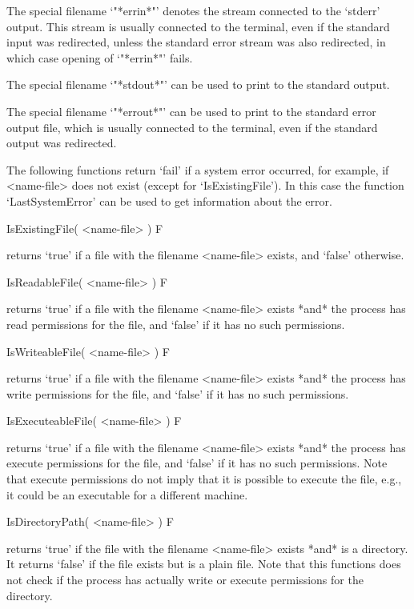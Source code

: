 The  special filename `"*errin*"' denotes   the stream connected  to  the
`stderr' output.  This stream is usually connected  to the terminal, even
if  the standard input was  redirected, unless the  standard error stream
was also redirected, in which case opening of `"*errin*"' fails.
    
The special filename `"*stdout*"'  can be used to  print to  the standard
output.

The special  filename `"*errout*"' can be  used to  print to the standard
error output file, which is usually  connected  to  the terminal, even if
the standard output was redirected.
    

The  following functions  return `fail'  if a system  error occurred, for
example, if <name-file> does not exist (except for `IsExistingFile').  In
this case  the function `LastSystemError'  can be used to get information
about the error.

\>IsExistingFile( <name-file> ) F

returns `true'  if   a file  with the filename   <name-file>  exists, and
`false' otherwise.

\>IsReadableFile( <name-file> ) F

returns `true' if a  file with the  filename <name-file> exists *and* the
{\GAP} process has read  permissions for the  file, and `false' if it has
no such permissions.

\>IsWriteableFile( <name-file> ) F

returns `true'  if a file with the  filename <name-file> exists *and* the
{\GAP} process has write permissions for the  file, and `false' if it has
no such permissions.

\>IsExecuteableFile( <name-file> ) F

returns `true' if  a file with the  filename <name-file> exists *and* the
{\GAP} process has execute  permissions for the file,  and `false' if  it
has no such permissions.  Note that execute permissions do not imply that
it is possible to execute the file, e.g., it could be an executable for a
different machine.

\>IsDirectoryPath( <name-file> ) F

returns `true' if the file with the  filename <name-file> exists *and* is
a directory.  It returns `false' if the file  exists but is a plain file.
Note  that this  functions does  not  check if   the  {\GAP} process  has
actually write or execute permissions for the directory.

